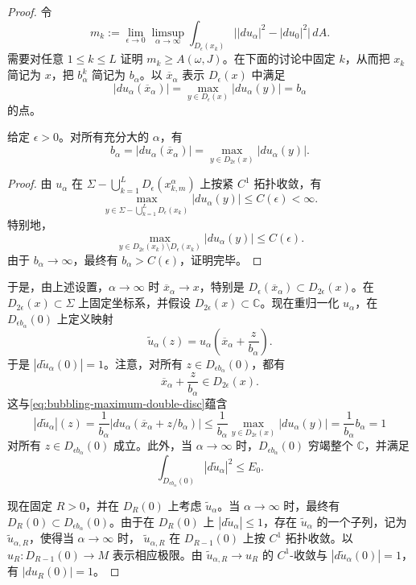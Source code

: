 \begin{proof}
令
\[
 m_k:=\lim_{\epsilon\to0}\limsup_{\alpha\to\infty}
 \int_{D_\epsilon(x_k)}
 \bigl||du_\alpha|^2-|du_0|^2\bigr|\,dA.
\]
需要对任意 $1\leq k\leq L$ 证明 $m_k\geq A(\omega,J)$。在下面的讨论中固定 $k$，从而把 $x_k$ 简记为 $x$，把 $b_\alpha^k$ 简记为 $b_\alpha$。以 $\overline x_\alpha$ 表示
$D_\epsilon(x)$ 中满足
\[
 |du_\alpha(\overline x_\alpha)|
 =\max_{y\in D_\epsilon(x)}|du_\alpha(y)|=b_\alpha
\]
的点。

\begin{lemma}\label{lem:bubbling-maximum-double-disc}
给定 $\epsilon>0$。对所有充分大的 $\alpha$，有
\begin{equation}
 b_\alpha=|du_\alpha(\overline x_\alpha)|
 =\max_{y\in D_{2\epsilon}(x)}|du_\alpha(y)|.
 \label{eq:bubbling-maximum-double-disc}
\end{equation}
\end{lemma}

\begin{proof}
由 $u_\alpha$ 在
$\Sigma-\bigcup_{k=1}^LD_\epsilon(x_{k,m}^\alpha)$ 上按紧 $C^1$ 拓扑收敛，有
\[
 \max_{y\in\Sigma-\bigcup_{k=1}^LD_\epsilon(x_k)}|du_\alpha(y)|
 \leq C(\epsilon)<\infty.
\]
特别地，
\[
 \max_{y\in D_{2\epsilon}(x_k)\setminus D_\epsilon(x_k)}
 |du_\alpha(y)|\leq C(\epsilon).
\]
由于 $b_\alpha\to\infty$，最终有 $b_\alpha>C(\epsilon)$，证明完毕。
\end{proof}

于是，由上述设置，$\alpha\to\infty$ 时
$\overline x_\alpha\to x$，特别是
$D_\epsilon(\overline x_\alpha)\subset D_{2\epsilon}(x)$。在
$D_{2\epsilon}(x)\subset\Sigma$ 上固定坐标系，并假设
$D_{2\epsilon}(x)\subset\mathbb C$。现在重归一化 $u_\alpha$，在
$D_{\epsilon b_\alpha}(0)$ 上定义映射
\[
 \widetilde u_\alpha(z)
 =u_\alpha\left(\overline x_\alpha+\frac z{b_\alpha}\right).
\]
于是 $|d\widetilde u_\alpha(0)|=1$。注意，对所有
$z\in D_{\epsilon b_\alpha}(0)$，都有
\[
 \overline x_\alpha+\frac z{b_\alpha}\in D_{2\epsilon}(x).
\]
这与\eqref{eq:bubbling-maximum-double-disc}蕴含
\[
 |d\widetilde u_\alpha|(z)
 =\frac1{b_\alpha}
 |du_\alpha(\overline x_\alpha+z/b_\alpha)|
 \leq\frac1{b_\alpha}
 \max_{y\in D_{2\epsilon}(x)}|du_\alpha(y)|
 =\frac1{b_\alpha}b_\alpha=1
\]
对所有 $z\in D_{\epsilon b_\alpha}(0)$ 成立。此外，当
$\alpha\to\infty$ 时，$D_{\epsilon b_\alpha}(0)$ 穷竭整个
$\mathbb C$，并满足
\[
 \int_{D_{\epsilon b_\alpha}(0)}|d\widetilde u_\alpha|^2\leq E_0.
\]

现在固定 $R>0$，并在 $D_R(0)$ 上考虑 $\widetilde u_\alpha$。当
$\alpha\to\infty$ 时，最终有
$D_R(0)\subset D_{\epsilon b_\alpha}(0)$。由于在 $D_R(0)$ 上
$|d\widetilde u_\alpha|\leq1$，存在 $\widetilde u_\alpha$ 的一个子列，记为 $\widetilde u_{\alpha,R}$，使得当 $\alpha\to\infty$ 时，
$\widetilde u_{\alpha,R}$ 在 $D_{R-1}(0)$ 上按 $C^1$ 拓扑收敛。以
$u_R:D_{R-1}(0)\to M$ 表示相应极限。由
$\widetilde u_{\alpha,R}\to u_R$ 的 $C^1$-收敛与
$|d\widetilde u_\alpha(0)|=1$，有 $|du_R(0)|=1$。


\end{proof}
